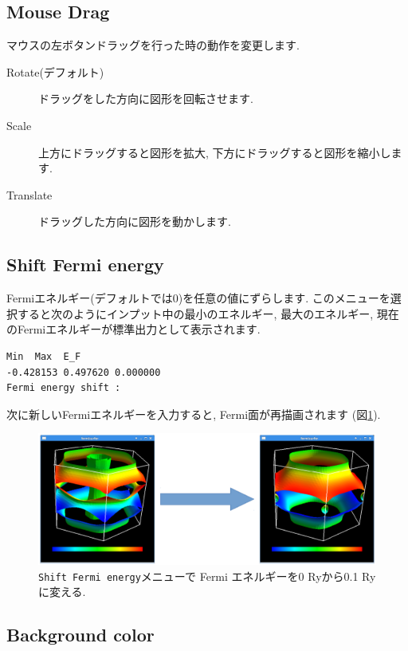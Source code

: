 \documentclass[12pt]{jarticle}
\begin{document}
\subsection{Mouse Drag}

マウスの左ボタンドラッグを行った時の動作を変更します.

\begin{description}
\item[Rotate(デフォルト)] ドラッグをした方向に図形を回転させます.
\item[Scale] 上方にドラッグすると図形を拡大, 下方にドラッグすると図形を縮小します.
\item[Translate] ドラッグした方向に図形を動かします.
\end{description}

\subsection{Shift Fermi energy}

Fermiエネルギー(デフォルトでは0)を任意の値にずらします.
このメニューを選択すると次のようにインプット中の最小のエネルギー, 
最大のエネルギー, 
現在のFermiエネルギーが標準出力として表示されます. 
\begin{verbatim}
Min  Max  E_F 
-0.428153 0.497620 0.000000 
Fermi energy shift : 
\end{verbatim}
次に新しいFermiエネルギーを入力すると, 
Fermi面が再描画されます (図\ref{fig_shift}).

\begin{figure}[!ht]
  \includegraphics[width=17cm]{figs/shift.eps}
  \caption{\texttt{Shift Fermi energy}メニューで
    Fermi エネルギーを0 Ryから0.1 Ryに変える.}
  \label{fig_shift}
\end{figure}

\subsection{Background color}
\end{document}
